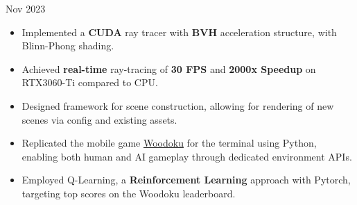 \documentclass[10pt,a4paper,ragged2e,withhyper]{altacv}
\begin{document}
\begin{paracol}{2}




    \vspace{-5pt}

    {Nov 2023 
    }{}
    \begin{itemize}
        \item Implemented a \textbf{CUDA} ray tracer with \textbf{BVH} acceleration structure, with Blinn-Phong shading.
        \item Achieved \textbf{real-time} ray-tracing of \textbf{30 FPS} and \textbf{2000x Speedup} on RTX3060-Ti compared to CPU\@.
        \item Designed framework for scene construction, allowing for rendering
              of new scenes via config and existing assets. \end{itemize}


    \vspace{-5pt}
    \divider{}
    \begin{itemize}

        \item Replicated the mobile game \href{https://play.google.com/store/apps/details?id=com.tripledot.woodoku&hl=en_CA&gl=US}{Woodoku} for the terminal using Python, enabling both human and AI gameplay through dedicated environment APIs.
        \item Employed Q-Learning, a \textbf{Reinforcement Learning} approach with Pytorch, targeting top scores on the Woodoku leaderboard.


\end{itemize}
\end{paracol}
\end{document}
